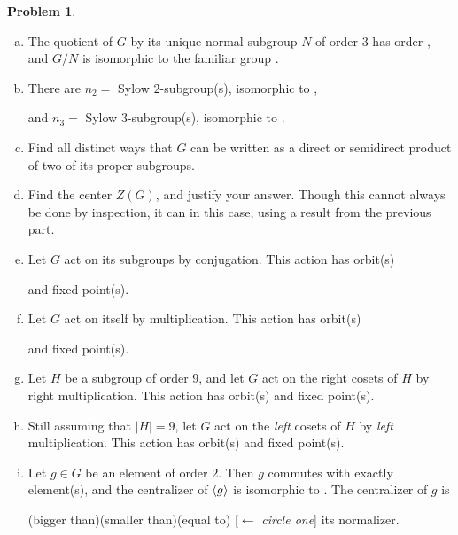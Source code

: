 \documentclass[12pt]{article}
\theoremstyle{definition} %
\newtheorem{problem}{Problem}
\begin{document}
\begin{problem}
\begin{enumerate}[(a)]
    \item The quotient of $G$ by its unique normal subgroup $N$ of order $3$ has order \uline{\hfill}, and $G/N$ is isomorphic to the familiar group \uline{\hfill}.


   \item There are $n_2=$\uline{\hfill} Sylow $2$-subgroup(s), isomorphic to \uline{\hfill}, 
   
   and $n_3=$\uline{\hfill} Sylow $3$-subgroup(s), isomorphic to \uline{\hfill}.
   
    \item Find all distinct ways that $G$ can be written as a direct or semidirect product of two of its proper subgroups. 
    
    \item Find the center $Z(G)$, and justify your answer. Though this cannot always be done by inspection, it can in this case, using a result from the previous part.

   \item Let $G$ act on its subgroups by conjugation. This action has \uline{\hfill} orbit(s) 
   
   and \uline{\hfill} fixed point(s). \hfill\hfill \,

   \item Let $G$ act on itself by multiplication. This action has \uline{\hfill} orbit(s) 
   
   and \uline{\hfill} fixed point(s). \hfill\hfill \,   

   \item Let $H$ be a subgroup of order $9$, and let $G$ act on the right cosets of $H$ 
   by right multiplication. This action has \uline{\hfill} orbit(s) and \uline{\hfill} fixed point(s).

   \item Still assuming that $|H|=9$, let $G$ act on the \emph{left} cosets of $H$ 
   by \emph{left} multiplication. This action has \uline{\hfill} orbit(s) and \uline{\hfill} fixed point(s).

  \item Let $g\in G$ be an element of order $2$. Then $g$ commutes with exactly 
  \uline{\hfill} element(s), and the centralizer of $\langle g\rangle$ is isomorphic to \uline{\hfill}. The centralizer of $g$ is 
  
  (bigger than)(smaller than)(equal to) [$\longleftarrow$ \emph{circle one}] its normalizer.
 \end{enumerate}
\end{problem}
\end{document}
